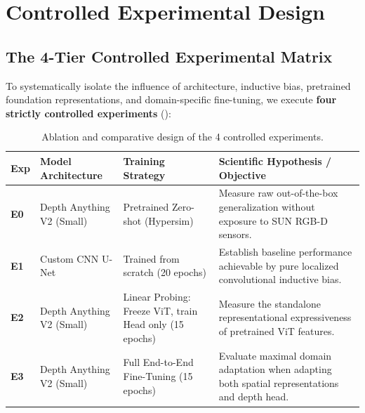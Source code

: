 \documentclass[twoside,final]{hcmut-report}
\begin{document}



\FloatBarrier

\section{Controlled Experimental Design}

\label{sec:experiments}

\subsection{The 4-Tier Controlled Experimental Matrix}

To systematically isolate the influence of architecture, inductive bias, pretrained foundation representations, and domain-specific fine-tuning, we execute \textbf{four strictly controlled experiments} ():

\begin{table}[!htbp]

  \centering

  \caption{Ablation and comparative design of the 4 controlled experiments.}

  \label{tab:experiment_matrix}

  \small

  \begin{tabularx}{\linewidth}{@{}l Y Y Y@{}}

    \toprule

    \textbf{Exp} & \textbf{Model Architecture} & \textbf{Training Strategy} & \textbf{Scientific Hypothesis / Objective} \\

    \midrule

    \textbf{E0} & Depth Anything V2 (Small) & Pretrained Zero-shot (Hypersim) & Measure raw out-of-the-box generalization without exposure to SUN RGB-D sensors. \\

    \textbf{E1} & Custom CNN U-Net & Trained from scratch (20 epochs) & Establish baseline performance achievable by pure localized convolutional inductive bias. \\

    \textbf{E2} & Depth Anything V2 (Small) & Linear Probing: Freeze ViT, train Head only (15 epochs) & Measure the standalone representational expressiveness of pretrained ViT features. \\

    \textbf{E3} & Depth Anything V2 (Small) & Full End-to-End Fine-Tuning (15 epochs) & Evaluate maximal domain adaptation when adapting both spatial representations and depth head. \\

    \bottomrule

  \end{tabularx}

\end{table}
\end{document}
